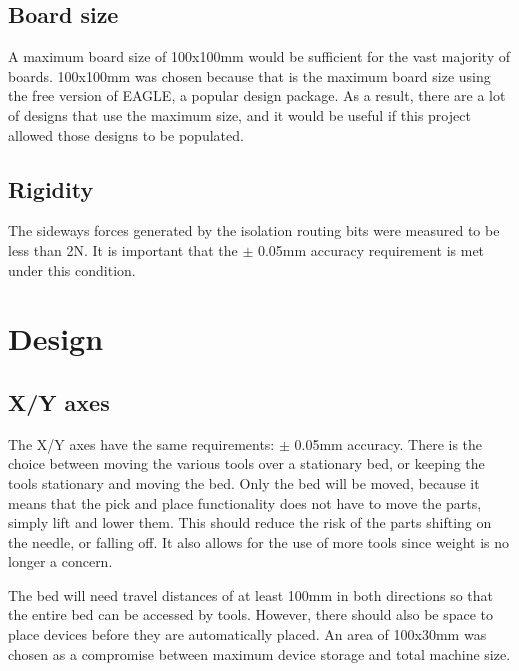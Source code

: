 \subsection{Board size}
A maximum board size of 100x100mm would be sufficient for the vast majority of boards. 100x100mm was chosen because that
is the maximum board size using the free version of EAGLE, a popular design package. As a result, there are a lot of designs
that use the maximum size, and it would be useful if this project allowed those designs to be populated.

\subsection{Rigidity}
The sideways forces generated by the isolation routing bits were measured to be less than 2N. It is important that the $\pm$ 0.05mm
accuracy requirement is met under this condition.

\section{Design}

\subsection{X/Y axes}

The X/Y axes have the same requirements: $\pm$ 0.05mm accuracy. There is the choice between moving the various tools over a stationary
bed, or keeping the tools stationary and moving the bed. Only the bed will be moved, because it means that the pick
and place functionality does not have to move the parts, simply lift and lower them. This should reduce the risk of the parts
shifting on the needle, or falling off. It also allows for the use of more tools since weight is no longer a concern.

The bed will need travel distances of at least 100mm in both directions so that the entire bed can be accessed by tools. However,
there should also be space to place devices before they are automatically placed. An area of 100x30mm was chosen as a compromise
between maximum device storage and total machine size.

